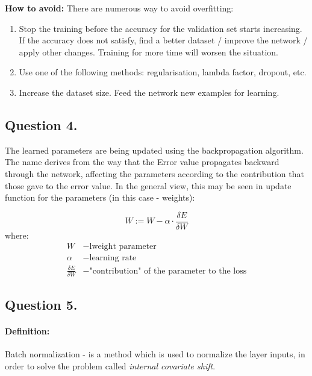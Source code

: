 \documentclass[a4paper]{iacas}
\begin{document}
\textbf{How to avoid: }There are numerous way to avoid overfitting:
\begin{enumerate}
\item Stop the training before the accuracy for the validation set starts increasing. If the accuracy does not satisfy, find a better dataset / improve the network / apply other changes. Training for more time will worsen the situation.
\item Use one of the following methods: regularisation, lambda factor, dropout, etc.
\item Increase the dataset size. Feed the network new examples for learning.
\end{enumerate}







\newpage
\subsection{Question 4.}
The learned parameters are being updated using the backpropagation algorithm. The name derives from the way that the Error value propagates backward through the network, affecting the parameters according to the contribution that those gave to the error value. In the general view, this may be seen in update function for the parameters (in this case - weights):

\begin{equation*}
W := W - \alpha\cdot\frac{\delta E}{\delta W}
\end{equation*}
where:
\begin{align*} 
W &- \text{lweight parameter} \\
\alpha &- \text{learning rate} \\
\frac{\delta E}{\delta W} &- \text{"contribution" of the parameter to the loss}
\end{align*}

\newpage
\subsection{Question 5.}
\paragraph{\textbf{Definition:}}Batch normalization - is a method which is used to normalize the layer inputs, in order to solve the problem called \textit{internal covariate shift}. 
\end{document}

